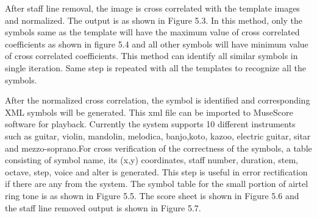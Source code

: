 \documentclass[journal]{IEEEtran}
\begin{document}
After staff line removal, the image is cross correlated with the template images and normalized. The output is as shown in Figure 5.3. In this method, only the symbols same as the template will have the maximum value of cross correlated coefficients as shown in figure 5.4 and all other symbols will have minimum value of cross correlated coefficients. This method can identify all similar symbols in single iteration. Same step is repeated with all the templates to recognize all the symbols. \par
After the normalized cross correlation, the symbol is identified and corresponding XML symbols will be generated. This xml file can be imported to MuseScore software for playback. Currently the system supports 10 different instruments such as guitar, violin, mandolin, melodica, banjo,koto, kazoo, electric guitar, sitar and mezzo-soprano.For cross verification of the correctness of the symbols, a table consisting of symbol name, its (x,y) coordinates, staff number, duration, stem, octave, step, voice and alter is generated. This step is useful in error rectification if there are any from the system. The symbol table for the small portion of airtel ring tone is as shown in Figure 5.5. The score sheet is shown in Figure 5.6 and the staff line removed output is shown in Figure 5.7.




%
\end{document}
